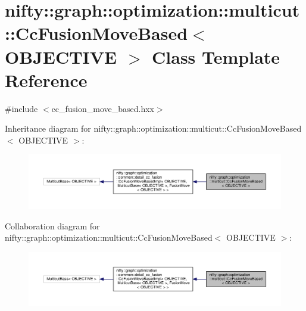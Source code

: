 \hypertarget{classnifty_1_1graph_1_1optimization_1_1multicut_1_1CcFusionMoveBased}{}\section{nifty\+:\+:graph\+:\+:optimization\+:\+:multicut\+:\+:Cc\+Fusion\+Move\+Based$<$ O\+B\+J\+E\+C\+T\+I\+V\+E $>$ Class Template Reference}
\label{classnifty_1_1graph_1_1optimization_1_1multicut_1_1CcFusionMoveBased}


{\ttfamily \#include $<$cc\+\_\+fusion\+\_\+move\+\_\+based.\+hxx$>$}



Inheritance diagram for nifty\+:\+:graph\+:\+:optimization\+:\+:multicut\+:\+:Cc\+Fusion\+Move\+Based$<$ O\+B\+J\+E\+C\+T\+I\+V\+E $>$\+:\nopagebreak
\begin{figure}[H]
\begin{center}
\leavevmode
\includegraphics[width=350pt]{classnifty_1_1graph_1_1optimization_1_1multicut_1_1CcFusionMoveBased__inherit__graph}
\end{center}
\end{figure}


Collaboration diagram for nifty\+:\+:graph\+:\+:optimization\+:\+:multicut\+:\+:Cc\+Fusion\+Move\+Based$<$ O\+B\+J\+E\+C\+T\+I\+V\+E $>$\+:\nopagebreak
\begin{figure}[H]
\begin{center}
\leavevmode
\includegraphics[width=350pt]{classnifty_1_1graph_1_1optimization_1_1multicut_1_1CcFusionMoveBased__coll__graph}
\end{center}
\end{figure}
